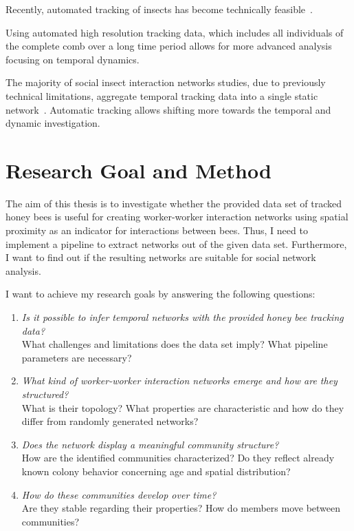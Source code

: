 Recently, automated tracking of insects has become technically feasible~\cite{wario2015automatic, crall2015beetag, fiala2005comparing}.

Using automated high resolution tracking data, which includes all individuals of the complete comb over a long time period allows for more advanced analysis focusing on temporal dynamics.


The majority of social insect interaction networks studies, due to previously technical limitations, aggregate temporal tracking data into a single static network~\cite[Chapter~15]{krause2014animal}.
Automatic tracking allows shifting more towards the temporal and dynamic investigation.


\section{Research Goal and Method}
\label{sec:intro:goals}
The aim of this thesis is to investigate whether the provided data set of tracked honey bees is useful for creating worker-worker interaction networks using spatial proximity as an indicator for interactions between bees. Thus, I need to implement a pipeline to extract networks out of the given data set. Furthermore, I want to find out if the resulting networks are suitable for social network analysis.

I want to achieve my research goals by answering the following questions:

\begin{enumerate}
\item \emph{Is it possible to infer temporal networks with the provided honey bee tracking data?}\\
What challenges and limitations does the data set imply?
What pipeline parameters are necessary?
\item \emph{What kind of worker-worker interaction networks emerge and how are they structured?}\\
What is their topology?
What properties are characteristic and how do they differ from randomly generated networks?
\item \emph{Does the network display a meaningful community structure?}\\
How are the identified communities characterized?
Do they reflect already known colony behavior concerning age and spatial distribution?
\item \emph{How do these communities develop over time?}\\
Are they stable regarding their properties?
How do members move between communities?
\end{enumerate}

